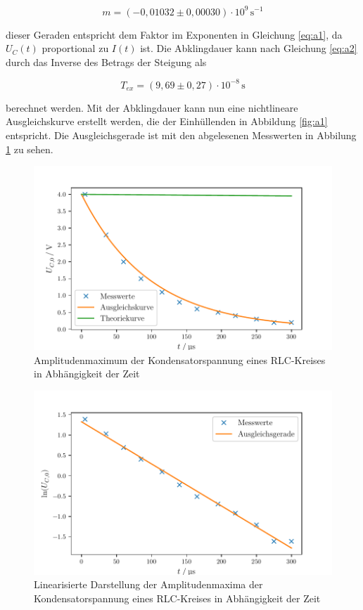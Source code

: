 \begin{equation*}
  m=(-0,01032\pm 0,00030)\cdot 10^{9}\,\si{\second}^{-1}
\end{equation*}

\noindent dieser Geraden entspricht dem Faktor im Exponenten in Gleichung \ref{eq:a1},
da $U_C(t)$ proportional zu $I(t)$ ist. Die Abklingdauer
kann nach Gleichung \ref{eq:a2} durch das 
Inverse des Betrags der Steigung als 

\begin{equation*}
  T_{ex}=(9,69 \pm 0,27) \cdot 10^{-8}\,\si{\second}
\end{equation*}

\noindent berechnet werden. Mit der Abklingdauer kann nun eine nichtlineare Ausgleichskurve
erstellt werden, die der Einhüllenden in Abbildung \ref{fig:a1}
entspricht. Die Ausgleichsgerade ist mit den abgelesenen
Messwerten in Abbilung \ref{fig:a} zu sehen.

\begin{figure}[H]
  \centering
  \includegraphics{build/plot1.pdf}
  \caption{Amplitudenmaximum der Kondensatorspannung eines RLC-Kreises in Abhängigkeit der Zeit}
  \label{fig:a}
\end{figure}

\begin{figure}[H]
  \centering
  \includegraphics{build/plot1-1.pdf}
  \caption{Linearisierte Darstellung der Amplitudenmaxima der Kondensatorspannung eines RLC-Kreises in Abhängigkeit der Zeit}
  \label{fig:b}
\end{figure}


